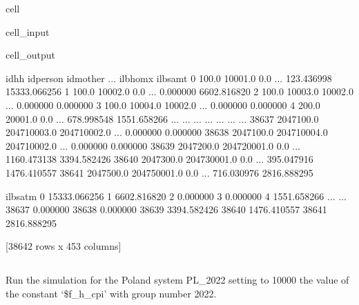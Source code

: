\documentclass[letterpaper,10pt,english]{sphinxmanual}
\begin{document}
\begin{sphinxuseclass}{cell}
\begin{sphinxuseclass}{cell_input}
\begin{sphinxVerbatim}[commandchars=\\\{\}]
\PYG{p}{[}\PYG{p}{]}\PYG{p}{[}\PYG{p}{]}
\end{sphinxVerbatim}

\end{sphinxuseclass}
\begin{sphinxuseclass}{cell_output}
\begin{sphinxVerbatim}[commandchars=\\\{\}]
            idhh     idperson     idmother  ...     il\PYGZus{}bhomx      il\PYGZus{}bsamt  \PYGZbs{}
0          100.0      10001.0          0.0  ...   123.436998  15333.066256   
1          100.0      10002.0          0.0  ...     0.000000   6602.816820   
2          100.0      10003.0      10002.0  ...     0.000000      0.000000   
3          100.0      10004.0      10002.0  ...     0.000000      0.000000   
4          200.0      20001.0          0.0  ...   678.998548   1551.658266   
...          ...          ...          ...  ...          ...           ...   
38637  2047100.0  204710003.0  204710002.0  ...     0.000000      0.000000   
38638  2047100.0  204710004.0  204710002.0  ...     0.000000      0.000000   
38639  2047200.0  204720001.0          0.0  ...  1160.473138   3394.582426   
38640  2047300.0  204730001.0          0.0  ...   395.047916   1476.410557   
38641  2047500.0  204750001.0          0.0  ...   716.030976   2816.888295   

           il\PYGZus{}bsatm  
0      15333.066256  
1       6602.816820  
2          0.000000  
3          0.000000  
4       1551.658266  
...             ...  
38637      0.000000  
38638      0.000000  
38639   3394.582426  
38640   1476.410557  
38641   2816.888295  

[38642 rows x 453 columns]
\end{sphinxVerbatim}

\end{sphinxuseclass}
\end{sphinxuseclass}

\subsection{}
\label{\detokenize{notebooks/example:run-with-changing-constant}}
\sphinxAtStartPar
Run the simulation for the Poland system PL\_2022 setting to 10000 the value of the constant ‘\$f\_h\_cpi’ with group number 2022.
\end{document}
